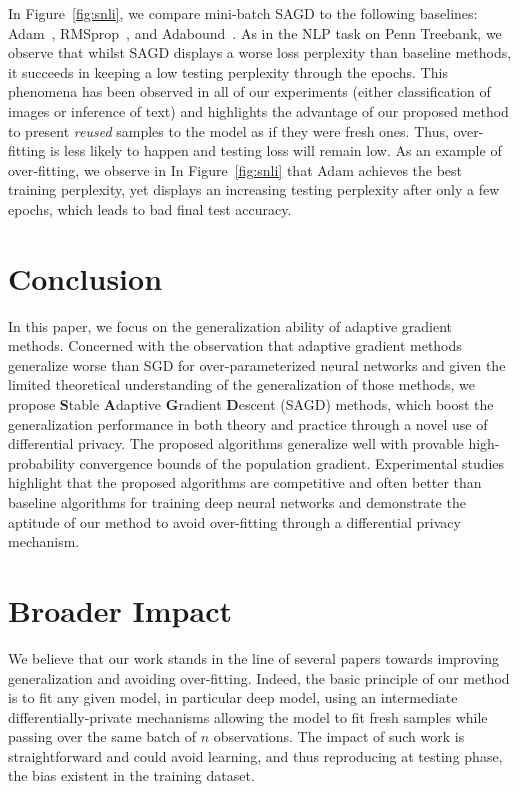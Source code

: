 \documentclass[11pt]{article}
\begin{document}
In Figure~\ref{fig:snli}, we compare mini-batch SAGD to the following baselines: Adam~\citep{kiba15},  RMSprop~\citep{tige12}, and Adabound~\citep{luxi2019}. 
As in the NLP task on Penn Treebank, we observe that whilst SAGD displays a worse loss perplexity than baseline methods, it succeeds in keeping a low testing perplexity through the epochs.
This phenomena has been observed in all of our experiments (either classification of images or inference of text) and highlights the advantage of our proposed method to present \emph{reused} samples to the model as if they were fresh ones. 
Thus, over-fitting is less likely to happen and testing loss will remain low.
As an example of over-fitting, we observe in In Figure~\ref{fig:snli} that Adam achieves the best training perplexity, yet displays an increasing testing perplexity after only a few epochs, which leads to bad final test accuracy.

\section{Conclusion}\label{sec: conclusion}


In this paper, we focus on the generalization ability of adaptive gradient methods. 
Concerned with the observation that adaptive gradient methods generalize worse than SGD for over-parameterized neural networks and given the limited theoretical understanding of the generalization of those methods,
we propose \textbf{S}table \textbf{A}daptive \textbf{G}radient \textbf{D}escent (\textsc{SAGD}) methods, which boost the generalization performance in both theory and practice through a novel use of differential privacy. 
The proposed algorithms generalize well with provable high-probability convergence bounds of the population gradient. 
Experimental studies highlight that the proposed algorithms are competitive and often better than baseline algorithms for training deep neural networks and demonstrate the aptitude of our method to avoid over-fitting through a differential privacy mechanism.


\clearpage
\section{Broader Impact}
We believe that our work stands in the line of several papers towards improving generalization and avoiding over-fitting.
Indeed, the basic principle of our method is to fit any given model, in particular deep model, using an intermediate differentially-private mechanisms allowing the model to fit fresh samples while passing over the same batch of $n$ observations.
The impact of such work is straightforward and could avoid learning, and thus reproducing at testing phase, the bias existent in the training dataset.






\clearpage


\appendix


\end{document}
